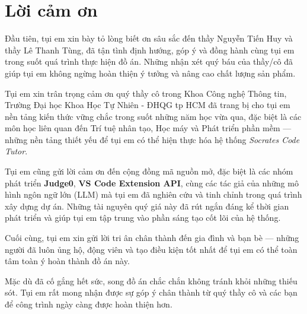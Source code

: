 \chapter*{Lời cảm ơn}
\label{thanks}

Đầu tiên, tụi em xin bày tỏ lòng biết ơn sâu sắc đến thầy Nguyễn Tiến Huy và thầy Lê Thanh Tùng, đã tận tình định hướng, góp ý và đồng hành cùng tụi em trong suốt quá trình thực hiện đồ án. Những nhận xét quý báu của thầy/cô đã giúp tụi em không ngừng hoàn thiện ý tưởng và nâng cao chất lượng sản phẩm.

Tụi em xin trân trọng cảm ơn quý thầy cô trong Khoa Công nghệ Thông tin, Trường Đại học Khoa Học Tự Nhiên - ĐHQG tp HCM đã trang bị cho tụi em nền tảng kiến thức vững chắc trong suốt những năm học vừa qua, đặc biệt là các môn học liên quan đến Trí tuệ nhân tạo, Học máy và Phát triển phần mềm — những nền tảng thiết yếu để tụi em có thể hiện thực hóa hệ thống \textit{Socrates Code Tutor}.

Tụi em cũng gửi lời cảm ơn đến cộng đồng mã nguồn mở, đặc biệt là các nhóm phát triển \textbf{Judge0}, \textbf{VS Code Extension API}, cùng các tác giả của những mô hình ngôn ngữ lớn (LLM) mà tụi em đã nghiên cứu và tinh chỉnh trong quá trình xây dựng dự án. Những tài nguyên quý giá này đã rút ngắn đáng kể thời gian phát triển và giúp tụi em tập trung vào phần sáng tạo cốt lõi của hệ thống.

Cuối cùng, tụi em xin gửi lời tri ân chân thành đến gia đình và bạn bè — những người đã luôn ủng hộ, động viên và tạo điều kiện tốt nhất để tụi em có thể toàn tâm toàn ý hoàn thành đồ án này.

Mặc dù đã cố gắng hết sức, song đồ án chắc chắn không tránh khỏi những thiếu sót. Tụi em rất mong nhận được sự góp ý chân thành từ quý thầy cô và các bạn để công trình ngày càng được hoàn thiện hơn.

